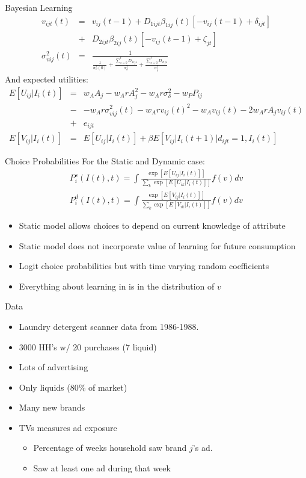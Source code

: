 \documentclass[xcolor=pdftex,dvipsnames,table,mathserif,aspectratio=169]{beamer}
\begin{document}
\begin{frame}{Bayesian Learning}
\begin{eqnarray*}
v_{ijt}(t) &=& v_{ij}(t-1) + D_{1ijt} \beta_{1ij}(t)[-v_{ij}(t-1) + \delta_{ijt}]  \\
&+& D_{2ijt} \beta_{2ij}(t)[-v_{ij}(t-1) + \zeta_{jt}]\\
\sigma_{vij}^2(t) &=& \frac{1}{\frac{1}{\sigma_v^2(0)} + \frac{\sum_{s=0}^t D_{1ijs}}{\sigma_{\delta}^2} + \frac{\sum_{s=0}^t D_{2ijs}}{\sigma_{\zeta}^2}}
\end{eqnarray*}
And expected utilities:
\begin{eqnarray*}
E[U_{ij} | I_i(t)] &=& w_A A_j - w_A r A_j^2 -w_A r \sigma_{\delta}^2 -w_P P_{ij} \\
&-& -w_A r \sigma_{vij}^2(t) - w_A r v_{ij}(t)^2  - w_A v_{ij}(t) - 2w_A r A_j v_{ij} (t) \\ &+& e_{ijt}\\
E[V_{ij} | I_i(t)] &=& E[U_{ij} | I_i(t)] + \beta E[V_{ij} | I_i(t+1) | d_{ijt} =1, I_i(t)]
\end{eqnarray*}
\end{frame}


\begin{frame}{Choice Probabilities}
For the Static and Dynamic case:
\begin{eqnarray*}
P^s_i(I(t),t) = \int \frac{\exp [E [U_{ij} | I_i(t)] ] } {\sum_k \exp [E [U_{ik} | I_i(t)] ] } f(v) dv\\
P^d_i(I(t),t) = \int \frac{\exp [E [V_{ij} | I_i(t)] ] } {\sum_k \exp [E [V_{ik} | I_i(t)] ] } f(v) dv
\end{eqnarray*}
\begin{itemize}
\item Static model allows choices to depend on 
\alert{current knowledge of attribute}
\item Static model does not incorporate \alert{value of learning for future consumption}
\item Logit choice probabilities but with time varying random coefficients
\item Everything about learning in is in the distribution of $v$
\end{itemize}
\end{frame}


\begin{frame}{Data}
\begin{itemize}
\item Laundry detergent scanner data from 1986-1988.
\item 3000 HH's w/ 20 purchases (7 liquid)
\item Lots of advertising
\item Only liquids (80\% of market)
\item Many new brands
\item  TVs measures ad exposure
\begin{itemize}
\item Percentage of weeks household saw brand $j$'s ad.
\item Saw at least one ad during that week
\end{itemize}
\end{itemize}
\end{frame}
\end{document}

